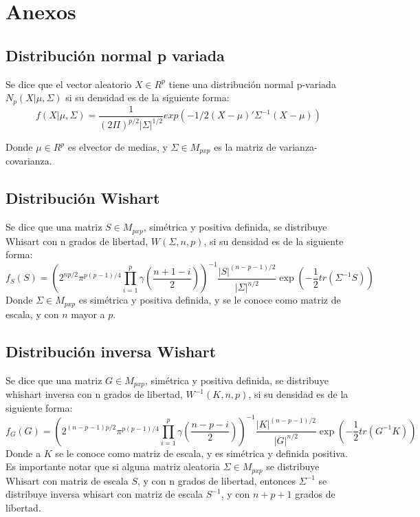 \documentclass[11pt]{book}
\begin{document}
\chapter*{Anexos}
\section{Distribución normal p variada}
Se dice que el vector aleatorio $X\in R^{p}$ tiene una distribución normal p-variada $N_{p}(X|\mu,\Sigma)$ si su densidad es de la siguiente forma:
\begin{equation*}
f(X|\mu,\Sigma)=\dfrac{1}{(2\Pi)^{p/2}|\Sigma|^{1/2}}exp(-1/2(X-\mu)'\Sigma^{-1}(X-\mu))
\end{equation*}

Donde $\mu\in R^{p}$ es elvector de medias, y $\Sigma\in M_{pxp}$ es la matriz de varianza-covarianza.

\section{Distribución Wishart}
Se dice que una matriz $S\in M_{pxp}$, simétrica y positiva definida, se distribuye Whisart con n grados de libertad, $W(\Sigma,n,p)$, si su densidad es de la siguiente forma:
\begin{equation*}
f_{S}(S)= (2^{np/2}\pi ^{p(p-1)/4}\prod_{i=1}^{p}\gamma(\dfrac{n+1-i}{2}))^{-1}\frac{|S|^{(n-p-1)/2}}{|\Sigma|^{n/2}}\exp(-\frac{1}{2}tr(\Sigma^{-1}S))
\end{equation*}
Donde $\Sigma \in M_{pxp}$ es simétrica y positiva definida, y se le conoce como matriz de escala, y con $n$ mayor a $p$.

\section{Distribución inversa Wishart}
Se dice que una matriz $G \in M_{pxp}$, simétrica y positiva definida, se distribuye whishart inversa con n grados de libertad, $W^{-1}(K,n,p)$, si su densidad es de la siguiente forma:
\begin{equation*}
f_{G}(G)=(2^{(n-p-1)p/2}\pi^{p(p-1)/4}\prod_{i=1}^{p}\gamma(\frac{n-p-i}{2}))^{-1}\frac{|K|^{(n-p-1)/2}}{|G|^{n/2}}\exp(-\frac{1}{2}tr(G^{-1}K))
\end{equation*}
Donde a $K$ se le conoce como matriz de escala, y es simétrica y definida positiva.
Es importante notar que si alguna matriz aleatoria $\Sigma \in M_{pxp}$ se distribuye Whisart con matriz de escala $S$, y con n grados de libertad, entonces $\Sigma^{-1}$ se distribuye inversa whisart con matriz de escala $S^{-1}$, y con $n+p+1$ grados de libertad.
\end{document}
